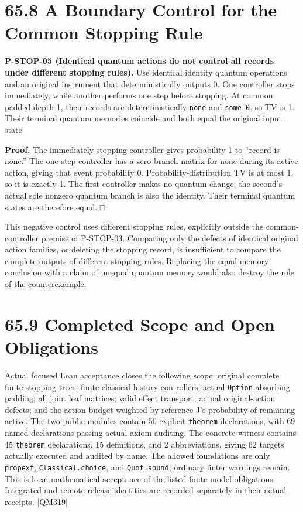\documentclass[
  11pt,
  oneside]{book}
\begin{document}
\section{65.8 A Boundary Control for the Common Stopping Rule}

\label{p-stop-05}{}

\textbf{P-STOP-05 (Identical quantum actions do not control all records
under different stopping rules).} Use identical identity quantum
operations and an original instrument that deterministically outputs 0.
One controller stops immediately, while another performs one step before
stopping. At common padded depth 1, their records are deterministically
\texttt{none} and \texttt{some\ 0}, so TV is 1. Their terminal quantum
memories coincide and both equal the original input state.

\textbf{Proof.} The immediately stopping controller gives probability 1
to ``record is none.'' The one-step controller has a zero branch matrix
for none during its active action, giving that event probability 0.
Probability-distribution TV is at most 1, so it is exactly 1. The first
controller makes no quantum change; the second's actual sole nonzero
quantum branch is also the identity. Their terminal quantum states are
therefore equal. □

This negative control uses different stopping rules, explicitly outside
the common-controller premise of P-STOP-03. Comparing only the defects
of identical original action families, or deleting the stopping record,
is insufficient to compare the complete outputs of different stopping
rules. Replacing the equal-memory conclusion with a claim of unequal
quantum memory would also destroy the role of the counterexample.

\section{65.9 Completed Scope and Open Obligations}

Actual focused Lean acceptance closes the following scope: original
complete finite stopping trees; finite classical-history controllers;
actual \texttt{Option} absorbing padding; all joint leaf matrices; valid
effect transport; actual original-action defects; and the action budget
weighted by reference J's probability of remaining active. The two
public modules contain 50 explicit \texttt{theorem} declarations, with
69 named declarations passing actual axiom auditing. The concrete
witness contains 45 \texttt{theorem} declarations, 15 definitions, and 2
abbreviations, giving 62 targets actually executed and audited by name.
The allowed foundations are only \texttt{propext},
\texttt{Classical.\allowbreak choice}, and \texttt{Quot.\allowbreak sound}; ordinary linter
warnings remain. This is local mathematical acceptance of the listed
finite-model obligations. Integrated and remote-release identities are
recorded separately in their actual receipts. {[}QM319{]}
\end{document}
